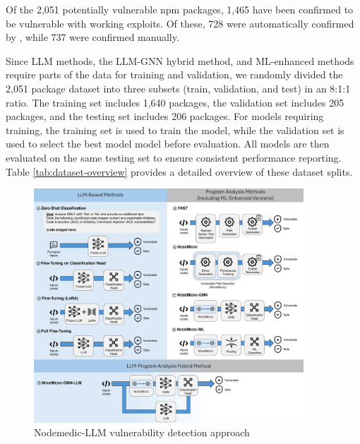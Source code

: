 \documentclass[12pt,openany,oneside,table]{cmuthesis}
\begin{document}
Of the 2,051 potentially vulnerable npm packages, 1,465 have been confirmed to be vulnerable with working exploits. Of these, 728 were automatically confirmed by \nodemedicfine, while 737 were confirmed manually. 

Since LLM methods, the LLM-GNN hybrid method, and ML-enhanced \nodemedicfine methods require parts of the data for training and validation, we randomly divided the 2,051 package dataset into three subsets (train, validation, and test) in an 8:1:1 ratio. The training set includes 1,640 packages, the validation set includes 205 packages, and the testing set includes 206 packages.
For models requiring training, the training set is used to train the model, while the validation set is used to select the best model model before evaluation. All models are then evaluated on the same testing set to ensure consistent performance reporting.
Table \ref{tab:dataset-overview} provides a detailed overview of these dataset splits.

\begin{figure}[t]
    \centering
    \includegraphics[width=0.9\textwidth]{figures/approach/nodemedic.pdf}
    \caption{Nodemedic-LLM vulnerability detection approach}
    \label{fig:nodemedic}
\end{figure}
\end{document}
